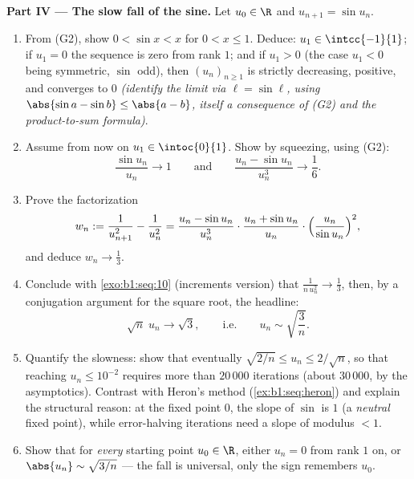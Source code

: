 \begin{problem}[{Weekend problem --- the Ces\`aro--Stolz theorem
and the asymptotics $u_n \sim \sqrt{3/n}$ for $u_{n+1} = \sin
u_n$}]
\medskip
\noindent\textbf{Part IV --- The slow fall of the sine.} Let
$u_0 \in \R$ and $u_{n+1} = \sin u_n$.
\begin{enumerate}[resume]
  \item From (G2), show $0 < \sin x < x$ for $0 < x \leq 1$.
        Deduce: $u_1 \in \intcc{-1}{1}$; if $u_1 = 0$ the
        sequence is zero from rank $1$; and if $u_1 > 0$ (the
        case $u_1 < 0$ being symmetric, $\sin$ odd), then
        $(u_n)_{n \geq 1}$ is strictly decreasing, positive, and
        converges to $0$ \emph{(identify the limit via $\ell =
        \sin \ell$, using $\abs{\sin a - \sin b} \leq \abs{a -
        b}$, itself a consequence of (G2) and the product-to-sum
        formula)}.
  \item Assume from now on $u_1 \in \intoc{0}{1}$. Show by
        squeezing, using (G2):
        \[
        \frac{\sin u_n}{u_n} \to 1
        \qquad\text{and}\qquad
        \frac{u_n - \sin u_n}{u_n^{3}} \to \frac16 .
        \]
  \item Prove the factorization
        \[
        w_n := \frac{1}{u_{n+1}^{2}} - \frac{1}{u_n^{2}}
        = \frac{u_n - \sin u_n}{u_n^{3}} \cdot
        \frac{u_n + \sin u_n}{u_n} \cdot
        \Bigl(\frac{u_n}{\sin u_n}\Bigr)^{2},
        \]
        and deduce $w_n \to \frac13$.
  \item Conclude with \cref{exo:b1:seq:10} (increments version)
        that $\frac{1}{n\,u_n^{2}} \to \frac13$, then, by a
        conjugation argument for the square root, the headline:
        \[
        \sqrt n\;u_n \longrightarrow \sqrt 3 ,
        \qquad\text{i.e.}\qquad
        u_n \sim \sqrt{\frac 3n} .
        \]
  \item Quantify the slowness: show that eventually $\sqrt{2/n}
        \leq u_n \leq 2/\sqrt n$, so that reaching $u_n \leq
        10^{-2}$ requires more than $20\,000$ iterations (about
        $30\,000$, by the asymptotics). Contrast with Heron's
        method (\cref{ex:b1:seq:heron}) and explain the
        structural reason: at the fixed point $0$, the slope of
        $\sin$ is $1$ (a \emph{neutral} fixed point), while
        error-halving iterations need a slope of modulus $< 1$.
  \item Show that for \emph{every} starting point $u_0 \in \R$,
        either $u_n = 0$ from rank $1$ on, or $\abs{u_n} \sim
        \sqrt{3/n}$ --- the fall is universal, only the sign
        remembers $u_0$.
\end{enumerate}


\end{problem}
